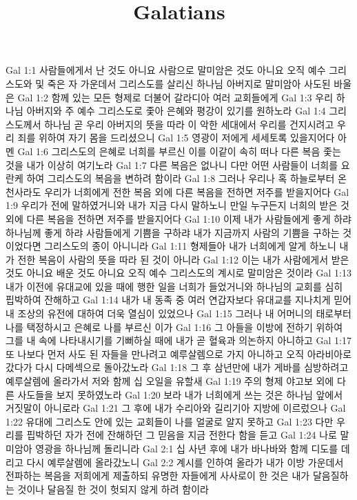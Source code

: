 

\title{Galatians}

Gal 1:1  사람들에게서 난 것도 아니요 사람으로 말미암은 것도 아니요 오직 예수 그리스도와 및 죽은 자 가운데서 그리스도를 살리신 하나님 아버지로 말미암아 사도된 바울은
Gal 1:2  함께 있는 모든 형제로 더불어 갈라디아 여러 교회들에게
Gal 1:3  우리 하나님 아버지와 주 예수 그리스도로 좇아 은혜와 평강이 있기를 원하노라
Gal 1:4  그리스도께서 하나님 곧 우리 아버지의 뜻을 따라 이 악한 세대에서 우리를 건지시려고 우리 죄를 위하여 자기 몸을 드리셨으니
Gal 1:5  영광이 저에게 세세토록 있을지어다 아멘
Gal 1:6  그리스도의 은혜로 너희를 부르신 이를 이같이 속히 떠나 다른 복음 좇는 것을 내가 이상히 여기노라
Gal 1:7  다른 복음은 없나니 다만 어떤 사람들이 너희를 요란케 하여 그리스도의 복음을 변하려 함이라
Gal 1:8  그러나 우리나 혹 하늘로부터 온 천사라도 우리가 너희에게 전한 복음 외에 다른 복음을 전하면 저주를 받을지어다
Gal 1:9  우리가 전에 말하였거니와 내가 지금 다시 말하노니 만일 누구든지 너희의 받은 것 외에 다른 복음을 전하면 저주를 받을지어다
Gal 1:10  이제 내가 사람들에게 좋게 하랴 하나님께 좋게 하랴 사람들에게 기쁨을 구하랴 내가 지금까지 사람의 기쁨을 구하는 것이었다면 그리스도의 종이 아니니라
Gal 1:11  형제들아 내가 너희에게 알게 하노니 내가 전한 복음이 사람의 뜻을 따라 된 것이 아니라
Gal 1:12  이는 내가 사람에게서 받은 것도 아니요 배운 것도 아니요 오직 예수 그리스도의 계시로 말미암은 것이라
Gal 1:13  내가 이전에 유대교에 있을 때에 행한 일을 너희가 들었거니와 하나님의 교회를 심히 핍박하여 잔해하고
Gal 1:14  내가 내 동족 중 여러 연갑자보다 유대교를 지나치게 믿어 내 조상의 유전에 대하여 더욱 열심이 있었으나
Gal 1:15  그러나 내 어머니의 태로부터 나를 택정하시고 은혜로 나를 부르신 이가
Gal 1:16  그 아들을 이방에 전하기 위하여 그를 내 속에 나타내시기를 기뻐하실 때에 내가 곧 혈육과 의논하지 아니하고
Gal 1:17  또 나보다 먼저 사도 된 자들을 만나려고 예루살렘으로 가지 아니하고 오직 아라비아로 갔다가 다시 다메섹으로 돌아갔노라
Gal 1:18  그 후 삼년만에 내가 게바를 심방하려고 예루살렘에 올라가서 저와 함께 십 오일을 유할새
Gal 1:19  주의 형제 야고보 외에 다른 사도들을 보지 못하였노라
Gal 1:20  보라 내가 너희에게 쓰는 것은 하나님 앞에서 거짓말이 아니로라
Gal 1:21  그 후에 내가 수리아와 길리기아 지방에 이르렀으나
Gal 1:22  유대에 그리스도 안에 있는 교회들이 나를 얼굴로 알지 못하고
Gal 1:23  다만 우리를 핍박하던 자가 전에 잔해하던 그 믿음을 지금 전한다 함을 듣고
Gal 1:24  나로 말미암아 영광을 하나님께 돌리니라
Gal 2:1  십 사년 후에 내가 바나바와 함께 디도를 데리고 다시 예루살렘에 올라갔노니
Gal 2:2  계시를 인하여 올라가 내가 이방 가운데서 전파하는 복음을 저희에게 제출하되 유명한 자들에게 사사로이 한 것은 내가 달음질하는 것이나 달음질 한 것이 헛되지 않게 하려 함이라
